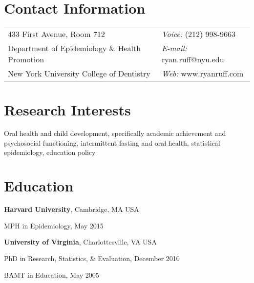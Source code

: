 \documentclass[margin,line]{res}
\newenvironment{list1}{
  \begin{list}{\ding{113}}{%
      \setlength{\itemsep}{0in}
      \setlength{\parsep}{0in} \setlength{\parskip}{0in}
      \setlength{\topsep}{0in} \setlength{\partopsep}{0in} 
      \setlength{\leftmargin}{0.17in}}}{\end{list}}
\newenvironment{list2}{
  \begin{list}{$\bullet$}{%
      \setlength{\itemsep}{0in}
      \setlength{\parsep}{0in} \setlength{\parskip}{0in}
      \setlength{\topsep}{0in} \setlength{\partopsep}{0in} 
      \setlength{\leftmargin}{0.2in}}}{\end{list}}
\begin{document}

\begin{resume}
\section{\sc Contact Information}
\vspace{.05in}
\begin{tabular}{@{}p{3.4in}p{3in}}
433 First Avenue, Room 712 & {\it Voice:}  (212) 998-9663 \\            
Department of Epidemiology \& Health Promotion  & {\it E-mail:}  ryan.ruff@nyu.edu\\       
New York University College of Dentistry & {\it Web:} www.ryanruff.com \\ 
\end{tabular}


\section{\sc Research Interests}
Oral health and child development, specifically academic achievement and psychosocial functioning, intermittent fasting and oral health, statistical epidemiology, education policy

\section{\sc Education}
{\bf Harvard University}, Cambridge, MA USA\\
\vspace*{-.1in}
\begin{list1}
\item[] MPH in Epidemiology,  May 2015
\end{list1}

{\bf University of Virginia}, Charlottesville, VA USA\\
\vspace*{-.1in}
\begin{list1}
\item[] PhD in Research, Statistics, \& Evaluation, December 2010 
\vspace*{.05in}
\item[] BAMT in Education,  May 2005
\end{list1}


\end{resume}
\end{document}
